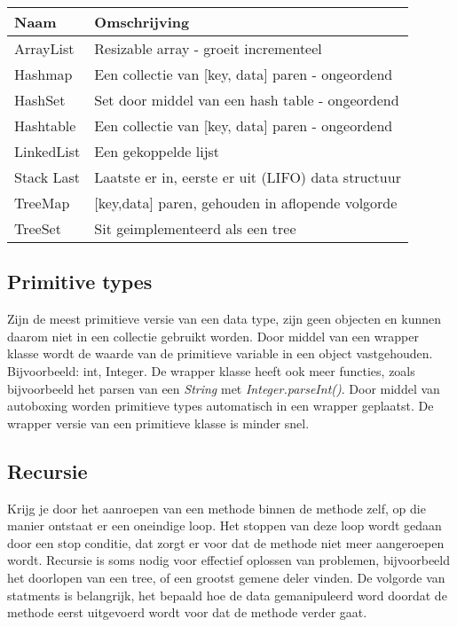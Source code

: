 \begin{center}
    \begin{tabular}{ll}
        Naam        & Omschrijving \\
        \midrule
        ArrayList   & Resizable  array - groeit incrementeel \\
        Hashmap     & Een collectie van [key, data] paren - ongeordend \\
        HashSet     & Set door middel van een hash table - ongeordend \\
        Hashtable   & Een collectie van [key, data] paren - ongeordend \\
        LinkedList  & Een gekoppelde lijst \\
        Stack Last  & Laatste er in, eerste er uit (LIFO) data structuur \\
        TreeMap     & [key,data] paren, gehouden in aflopende volgorde \\
        TreeSet     & Sit geimplementeerd als een tree \\
        \bottomrule
    \end{tabular}
\end{center}

\subsection{Primitive types}
Zijn de meest primitieve versie van een data type, zijn geen objecten en kunnen daarom niet in een collectie gebruikt worden.
Door middel van een wrapper klasse wordt de waarde van de primitieve variable in een object vastgehouden.
Bijvoorbeeld: int, Integer.
De wrapper klasse heeft ook meer functies, zoals bijvoorbeeld het parsen van een \textit{String} met \textit{Integer.parseInt()}.
Door middel van autoboxing worden primitieve types automatisch in een wrapper geplaatst.
De wrapper versie van een primitieve klasse is minder snel.

\subsection{Recursie}
Krijg je door het aanroepen van een methode binnen de methode zelf, op die manier ontstaat er een oneindige loop.
Het stoppen van deze loop wordt gedaan door een stop conditie, dat zorgt er voor dat de methode niet meer aangeroepen wordt.
Recursie is soms nodig voor effectief oplossen van problemen, bijvoorbeeld het doorlopen van een tree, of een grootst gemene deler vinden.
De volgorde van statments is belangrijk, het bepaald hoe de data gemanipuleerd word doordat de methode eerst uitgevoerd wordt voor dat de methode verder gaat.

